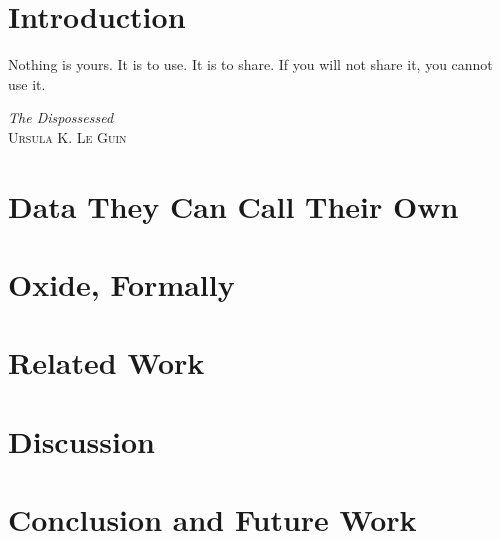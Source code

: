\documentclass[acmsmall,nonacm]{acmart}
\begin{document}


\maketitle

\section{Introduction}
\label{sec:intro}


\epigraph{Nothing is yours. It is to use. It is to share. If you will not share
  it, you cannot use it.}{\textit{The Dispossessed} \\ \textsc{Ursula K. Le Guin}}
\section{Data They Can Call Their Own}
\label{sec:main}


\section{Oxide, Formally}
\label{sec:formalization}


\section{Related Work}
\label{sec:related}


\section{Discussion}
\label{sec:discussion}


\section{Conclusion and Future Work}
\label{sec:conclusion}

\end{document}
